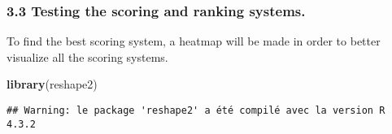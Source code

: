 \documentclass[
]{article}
\newenvironment{Shaded}{\begin{snugshade}}{\end{snugshade}}
\newcommand{\FunctionTok}[1]{\textcolor[rgb]{0.13,0.29,0.53}{\textbf{#1}}}
\newcommand{\NormalTok}[1]{#1}
\begin{document}
\subsubsection{3.3 Testing the scoring and ranking
systems.}\label{testing-the-scoring-and-ranking-systems.}

To find the best scoring system, a heatmap will be made in order to
better visualize all the scoring systems.

\begin{Shaded}
\begin{Highlighting}[]
\FunctionTok{library}\NormalTok{(reshape2)}
\end{Highlighting}
\end{Shaded}

\begin{verbatim}
## Warning: le package 'reshape2' a été compilé avec la version R 4.3.2
\end{verbatim}
\end{document}
